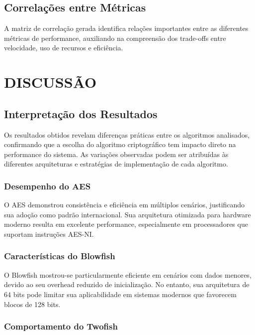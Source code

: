 \documentclass[12pt,a4paper,oneside]{article}
\begin{document}
\subsection{Correlações entre Métricas}

A matriz de correlação gerada identifica relações importantes entre as diferentes métricas de performance, auxiliando na compreensão dos trade-offs entre velocidade, uso de recursos e eficiência.

\section{DISCUSSÃO}

\subsection{Interpretação dos Resultados}

Os resultados obtidos revelam diferenças práticas entre os algoritmos analisados, confirmando que a escolha do algoritmo criptográfico tem impacto direto na performance do sistema. As variações observadas podem ser atribuídas às diferentes arquiteturas e estratégias de implementação de cada algoritmo.

\subsubsection{Desempenho do AES}

O AES demonstrou consistência e eficiência em múltiplos cenários, justificando sua adoção como padrão internacional. Sua arquitetura otimizada para hardware moderno resulta em excelente performance, especialmente em processadores que suportam instruções AES-NI.

\subsubsection{Características do Blowfish}

O Blowfish mostrou-se particularmente eficiente em cenários com dados menores, devido ao seu overhead reduzido de inicialização. No entanto, sua arquitetura de 64 bits pode limitar sua aplicabilidade em sistemas modernos que favorecem blocos de 128 bits.

\subsubsection{Comportamento do Twofish}
\end{document}
